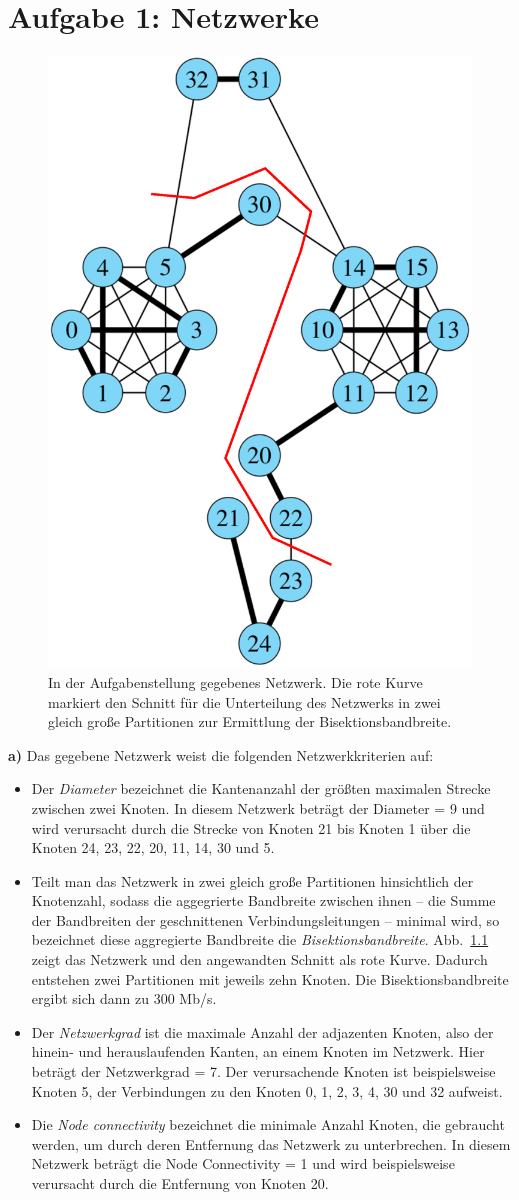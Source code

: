 \chapter{Aufgabe 1: Netzwerke}

\begin{figure}[tb]
 \centering 
 \includegraphics[width=.5\textwidth]{gegebenesNetzwerk_geschnitten.eps}
 \caption{In der Aufgabenstellung gegebenes Netzwerk. Die rote Kurve markiert den Schnitt für die Unterteilung des Netzwerks in zwei gleich große Partitionen zur Ermittlung der Bisektionsbandbreite.}
 \label{fig:netzwerk_geschnitten}
\end{figure}


\textbf{a)} Das gegebene Netzwerk weist die folgenden Netzwerkkriterien auf:
\begin{itemize}
 \item Der \emph{Diameter} bezeichnet die Kantenanzahl der größten maximalen Strecke zwischen zwei Knoten. In diesem Netzwerk beträgt der Diameter = 9 und wird verursacht durch die Strecke von Knoten 21 bis Knoten 1 über die Knoten 24, 23, 22, 20, 11, 14, 30 und 5. 
 \item Teilt man das Netzwerk in zwei gleich große Partitionen hinsichtlich der Knotenzahl, sodass die aggegrierte Bandbreite zwischen ihnen -- die Summe der Bandbreiten der geschnittenen Verbindungsleitungen -- minimal wird, so bezeichnet diese aggregierte Bandbreite die \emph{Bisektionsbandbreite}. Abb.~\ref{fig:netzwerk_geschnitten} zeigt das Netzwerk und den angewandten Schnitt als rote Kurve. Dadurch entstehen zwei Partitionen mit jeweils zehn Knoten. Die Bisektionsbandbreite ergibt sich dann zu 300 Mb/s.
 \item Der \emph{Netzwerkgrad} ist die maximale Anzahl der adjazenten Knoten, also der hinein- und herauslaufenden Kanten, an einem Knoten im Netzwerk. Hier beträgt der Netzwerkgrad = 7. Der verursachende Knoten ist beispielsweise Knoten 5, der Verbindungen zu den Knoten 0, 1, 2, 3, 4, 30 und 32 aufweist.
 \item Die \emph{Node connectivity} bezeichnet die minimale Anzahl Knoten, die gebraucht werden, um durch deren Entfernung das Netzwerk zu unterbrechen. In diesem Netzwerk beträgt die Node Connectivity = 1 und wird beispielsweise verursacht durch die Entfernung von Knoten 20. 
\end{itemize}

